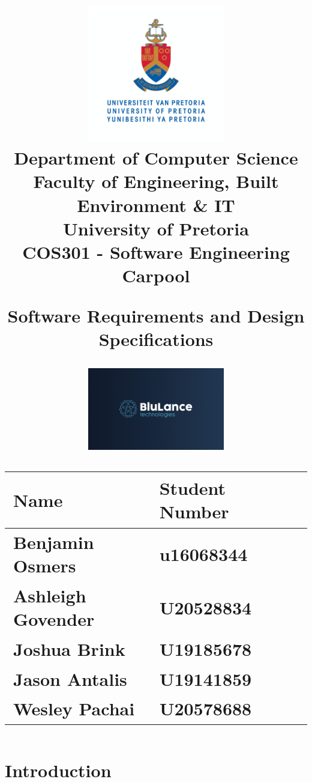\documentclass[hidelinks, 12pt, a4paper]{article}
\author{}
\date{}
\title
{
	\includegraphics[width=6cm]{images/up_logo.jpg} \\
	Department of Computer Science \\
	Faculty of Engineering, Built Environment \& IT\\
	University of Pretoria \\
	\vspace{0.5cm}
	\Huge COS301 -
	Software Engineering\\
	\vspace{1cm}
	{\Huge Carpool}\\
	\begin{Large}
		Software Requirements and Design Specifications
	\end{Large}
	\vspace{0.5cm}
	
    \begin{center}
    \noindent
    \includegraphics[width=6cm]{images/company_logo.png} 
    \vspace{0.5cm}
    \begin{table}[h]
    \centering
    \begin{tabular}{|l|l|l|}
    \hline
    Name  & Student Number\\ \hline
    Benjamin Osmers & u16068344 \\ \hline
    Ashleigh Govender &  U20528834      \\ \hline
    Joshua Brink  & U19185678 \\ \hline
    Jason Antalis     & U19141859     \\ \hline
    Wesley Pachai & U20578688    \\ \hline
            
    \end{tabular}
    \end{table}
    \end{center}
    }
\begin{document}
\maketitle


\newpage
\tableofcontents 
\newpage
\section{Introduction}


\end{document}
